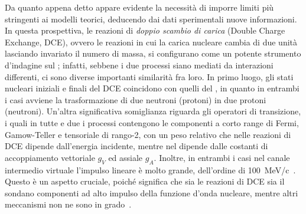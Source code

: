 Da quanto appena detto appare evidente la necessità di imporre limiti più stringenti ai modelli teorici, deducendo dai dati sperimentali nuove informazioni. 
In questa prospettiva, le reazioni di \emph{doppio scambio di carica} (Double Charge Exchange, DCE), ovvero le reazioni in cui la carica nucleare cambia di due unità lasciando invariato il numero di massa, si configurano come un potente strumento d'indagine sul \doppiobeta; 
infatti, sebbene i due processi siano mediati da interazioni differenti, ci sono diverse importanti similarità fra loro.
In primo luogo, gli stati nucleari iniziali e finali del DCE coincidono con quelli del \doppiobeta{}, in quanto in entrambi i casi avviene la trasformazione di due neutroni (protoni) in due protoni (neutroni). 
Un'altra significativa somiglianza riguarda gli operatori di transizione, i quali in tutte e due i processi contengono le componenti a corto range di Fermi, Gamow-Teller e tensoriale di rango-2, con un peso relativo che nelle reazioni di DCE dipende dall'energia incidente, mentre nel \doppiobeta{} dipende dalle costanti di accoppiamento vettoriale $g_V$ ed assiale $g_A$. 
Inoltre, in entrambi i casi nel canale intermedio virtuale l'impulso lineare è molto grande, dell'ordine di 100~MeV/c~\cite{barea:prl12}. Questo è un aspetto cruciale, poiché significa che sia le reazioni di DCE sia il \doppiobeta{} sondano componenti ad alto impulso della funzione d'onda nucleare, mentre altri meccanismi non ne sono in grado~\cite{puppe:prc11}.

